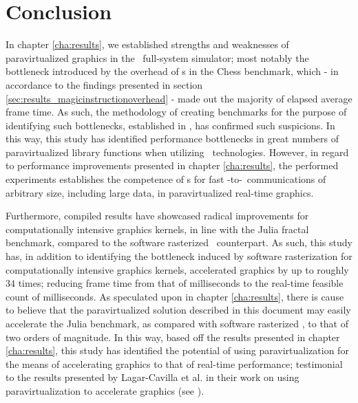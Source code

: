 
\chapter{Conclusion}
\label{cha:conclusion}
In chapter \ref{cha:results}, we established strengths and weaknesses of paravirtualized graphics in the \dvttermsimics\ full-system simulator; most notably the bottleneck introduced by the overhead of \dvttermmagicinstruction s in the Chess benchmark, which - in accordance to the findings presented in section \ref{sec:results_magicinstructionoverhead} - made out the majority of elapsed average frame time.
As such, the methodology of creating benchmarks for the purpose of identifying such bottlenecks, established in , has confirmed such suspicions.
In this way, this study has identified performance bottlenecks in great numbers of paravirtualized library functions when utilizing \dvttermmagicinstruction\ technologies.
However, in regard to performance improvements presented in chapter \ref{cha:results}, the performed experiments establishes the competence of \dvttermmagicinstruction s for fast \dvttermtarget -to-\dvttermhost\ communications of arbitrary size, including large data, in paravirtualized real-time graphics.

Furthermore, compiled results have showcased radical improvements for computationally intensive graphics kernels, in line with the Julia fractal benchmark, compared to the software rasterized \dvttermsimics\ counterpart.
As such, this study has, in addition to identifying the bottleneck induced by software rasterization for computationally intensive graphics kernels, accelerated graphics by up to roughly $34$ times; reducing frame time from that of  milliseconds to the real-time feasible count of  milliseconds.
As speculated upon in chapter \ref{cha:results}, there is cause to believe that the paravirtualized solution described in this document may easily accelerate the Julia benchmark, as compared with software rasterized \dvttermsimics , to that of two orders of magnitude.
In this way, based off the results presented in chapter \ref{cha:results}, this study has identified the potential of using paravirtualization for the means of accelerating graphics to that of real-time performance; testimonial to the results presented by Lagar-Cavilla et al. in their work on using paravirtualization to accelerate graphics (see ).

